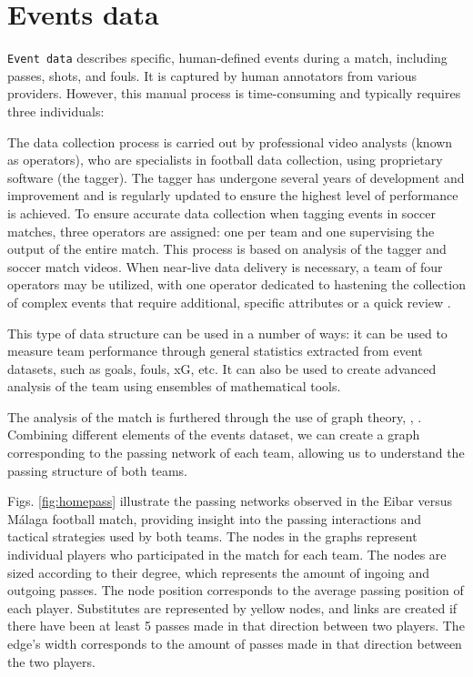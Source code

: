 \documentclass[
  twoside,nohyper]{book}
\begin{document}
\section{Events data}\label{events-data}

\texttt{Event\ data} describes specific, human-defined events during a match,
including passes, shots, and fouls. It is captured by human annotators
from various providers. However, this manual process is time-consuming
and typically requires three individuals:

The data collection process is carried out by professional video
analysts (known as operators), who are specialists in football data
collection, using proprietary software (the tagger). The tagger has
undergone several years of development and improvement and is regularly
updated to ensure the highest level of performance is achieved. To
ensure accurate data collection when tagging events in soccer matches,
three operators are assigned: one per team and one supervising the
output of the entire match. This process is based on analysis of the
tagger and soccer match videos. When near-live data delivery is
necessary, a team of four operators may be utilized, with one operator
dedicated to hastening the collection of complex events that require
additional, specific attributes or a quick review \citep{3}.

This type of data structure can be used in a number of ways: it can be
used to measure team performance through general statistics extracted
from event datasets, such as goals, fouls, xG, etc. It can also be used
to create advanced analysis of the team using ensembles of mathematical
tools.

The analysis of the match is furthered through the use of graph theory,
\citep{Buldu}, \citep{NOVILLO2024114355}. Combining
different elements of the events dataset, we can create a graph
corresponding to the passing network of each team, allowing us to
understand the passing structure of both teams.

Figs. \ref{fig:homepass} illustrate the
passing networks observed in the Eibar versus Málaga football match,
providing insight into the passing interactions and tactical strategies
used by both teams. The nodes in the graphs represent individual players
who participated in the match for each team. The nodes are sized
according to their degree, which represents the amount of ingoing and
outgoing passes. The node position corresponds to the average passing
position of each player. Substitutes are represented by yellow nodes,
and links are created if there have been at least 5 passes made in that
direction between two players. The edge's width corresponds to the
amount of passes made in that direction between the two players.
\end{document}

